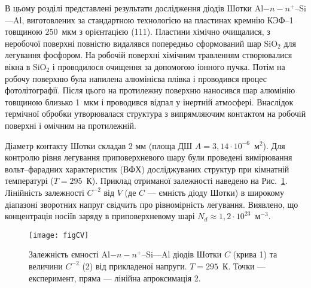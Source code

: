 

В цьому розділі представлені результати дослідження діодів Шотки Al$-n-n^+$--Si---Al,
виготовлених за стандартною технологією \cite{Vorobets:FM2003,StrihaBook1987} на пластинах кремнію КЭФ--1 товщиною $250$~мкм
з орієнтацією (111).
Пластини хімічно очищалися, з неробочої поверхні
повністю видалявся попередньо сформований шар SiO$_2$ для легування фосфором.
На робочій поверхні хімічним травленням створювалися вікна в SiO$_2$ і проводилося очищення
за допомогою іонного пучка.
Потім на робочу поверхню була напилена алюмінієва плівка і проводився процес фотолітографії.
Після цього на протилежну поверхню наносився шар алюмінію товщиною близько 1~мкм і проводився відпал
у інертній атмосфері.
Внаслідок термічної обробки утворювалася структура з випрямляючим контактом на робочій поверхні і омічним на протилежній.

Діаметр контакту Шотки складав 2 мм (площа ДШ $A=3,14\cdot10^{-6}$~м$^2$).
Для контролю рівня легування приповерхневого шару були проведені
вимірювання вольт--фарадних характеристик (ВФХ) досліджуваних структур при кімнатній температурі ($T = 295$~К).
Приклад отриманої залежності наведено на Рис.~\ref{figCV}.
Лінійність залежності $C^{-2}$ від $V$
(де $C$ --- ємність діоду Шотки)
в широкому діапазоні зворотних напруг свідчить про рівномірність легування.
Виявлено, що концентрація носіїв заряду в приповерхневому шарі $N_d\approx1,2\cdot10^{23}$~м$^{-3}$.


\begin{figure}
\center
\texttt{[image: figCV]}
\caption{\label{figCV}
Залежність ємності Al$-n-n^+$--Si---Al діодів Шотки $C$ (крива 1) та величини $C^{-2}$ (2) від прикладеної напруги.
$T=295$~К.
Точки --- експеримент, пряма --- лінійна апроксимація 2.
}%
\end{figure}











